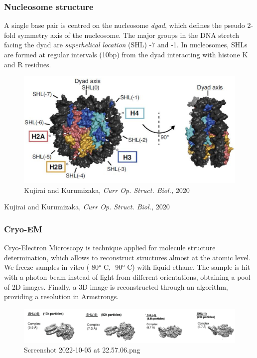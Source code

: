 \hypertarget{nucleosome-structure}{%
\subsubsection{Nucleosome structure}\label{nucleosome-structure}}

A single base pair is centred on the nucleosome \emph{dyad}, which defines the pseudo 2-fold symmetry axis of the nucleosome. The major groups in the DNA stretch facing the dyad are \emph{superhelical location} (SHL) -7 and -1. In nucleosomes, SHLs are formed at regular intervals (10bp) from the dyad interacting with histone K and R residues.

\begin{figure}
\centering
\includegraphics[width=\textwidth]{../_resources/Screenshot_2022-10-05_at_22-41-07.png}
\caption{Kujirai and Kurumizaka, \emph{Curr Op. Struct. Biol.,} 2020}
\end{figure}

Kujirai and Kurumizaka, \emph{Curr Op. Struct. Biol.,} 2020

\hypertarget{cryo-em}{%
\subsubsection{Cryo-EM}\label{cryo-em}}

Cryo-Electron Microscopy is technique applied for molecule structure determination, which allows to reconstruct structures almost at the atomic level. We freeze samples in vitro (-80° C, -90° C) with liquid ethane. The sample is hit with a photon beam instead of light from different orientations, obtaining a pool of 2D images. Finally, a 3D image is reconstructed through an algorithm, providing a resolution in Armstrongs.

\begin{figure}
\centering
\includegraphics[width=\textwidth]{../_resources/Screenshot_2022-10-05_at_22-57-06.png}
\caption{Screenshot 2022-10-05 at 22.57.06.png}
\end{figure}

